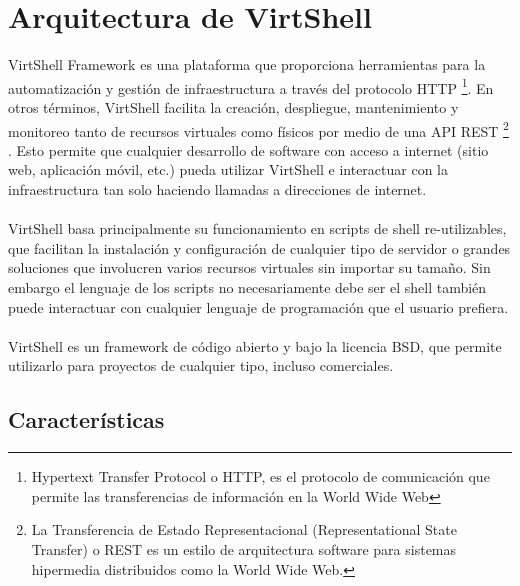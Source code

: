 \chapter{Arquitectura de VirtShell}
\label{Arquitectura}

VirtShell Framework es una plataforma que proporciona herramientas para la automatización y gestión de infraestructura a través del protocolo HTTP \footnote{Hypertext Transfer Protocol o HTTP, es el protocolo de comunicación que permite las transferencias de información en la World Wide Web}. En otros términos, VirtShell facilita la creación, despliegue, mantenimiento y monitoreo tanto de recursos virtuales como físicos por medio de una API REST \footnote{La Transferencia de Estado Representacional (Representational State Transfer) o REST es un estilo de arquitectura software para sistemas hipermedia distribuidos como la World Wide Web.} \cite{fielding00}. Esto permite que cualquier desarrollo de software con acceso a internet (sitio web, aplicación móvil, etc.) pueda utilizar VirtShell e interactuar con la infraestructura tan solo haciendo llamadas a direcciones de internet. \\
\\
VirtShell basa principalmente su funcionamiento en scripts de shell re-utilizables, que facilitan la instalación y configuración de cualquier tipo de servidor o grandes soluciones que involucren varios recursos virtuales sin importar su tamaño. Sin embargo el lenguaje de los scripts no necesariamente debe ser el shell también puede interactuar con cualquier lenguaje de programación que el usuario prefiera.\\
\\
VirtShell es un framework de código abierto y bajo la licencia BSD, que permite utilizarlo para proyectos de cualquier tipo, incluso comerciales. 

\section{Características}

